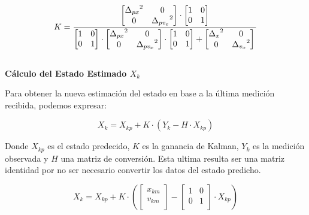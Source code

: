 $$ K =
    \frac{
        \begin{bmatrix}
        {\Delta_{px}}^2 & 0 \\
        0 & {\Delta_{pv_x}}^2 \\
        \end{bmatrix}
        \cdot
        \begin{bmatrix}
        1 & 0 \\
        0 & 1  \\
        \end{bmatrix}
        }
    {
        \begin{bmatrix}
        1 & 0 \\
        0 & 1  \\
        \end{bmatrix}
        \cdot
        \begin{bmatrix}
        {\Delta_{px}}^2 & 0 \\
        0 & {\Delta_{pv_x}}^2 \\
        \end{bmatrix}
        \cdot
        \begin{bmatrix}
        1 & 0 \\
        0 & 1  \\
        \end{bmatrix}
        +
        \begin{bmatrix}
        {\Delta_x}^2 & 0 \\
        0 & {\Delta_{v_x}}^2 \\
        \end{bmatrix} \\ 
    }
$$ \\

\textbf{Cálculo del Estado Estimado $X_k$} \mbox{} \vspace{8pt}

Para obtener la nueva estimación del estado en base a la última medición recibida, podemos expresar:

$$ X_k = X_{kp} + K \cdot ( Y_k - H \cdot X_{kp} ) $$

Donde $X_{kp}$ es el estado predecido, $K$ es la ganancia de Kalman, $Y_k$ es la medición observada y $H$ una matriz de conversión. Esta ultima resulta ser una matriz identidad por no ser necesario convertir los datos del estado predicho.

$$ X_k =
    X_{kp}
    +
    K
    \cdot (
        \begin{bmatrix} x_{km} \\ v_{km} \\ \end{bmatrix}
        -
        \begin{bmatrix}
        1 & 0 \\
        0 & 1  \\
        \end{bmatrix}
        \cdot
        X_{kp}
    )
$$ \\

